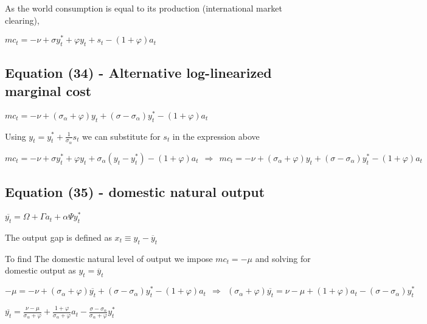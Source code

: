 \documentclass[
]{article}
\begin{document}
As the world consumption is equal to its production (international
market clearing),

\(\displaystyle mc_t =-\nu + \sigma y_t^*+ \varphi y_t+ s_t -(1+\varphi)a_t\)

\vspace{12pt}

\hypertarget{equation-34---alternative-log-linearized-marginal-cost}{%
\subsection{Equation (34) - Alternative log-linearized marginal
cost}\label{equation-34---alternative-log-linearized-marginal-cost}}

\(mc_t = -\nu + (\sigma_\alpha+\varphi)y_t + (\sigma-\sigma_\alpha)y_t^*-(1+\varphi)a_t\)

\vspace{18pt}

Using \(\displaystyle y_t = y_t^* + \frac{1}{\sigma_\alpha}s_t\) we can
substitute for \(s_t\) in the expression above

\(\displaystyle mc_t =-\nu + \sigma y_t^*+ \varphi y_t+ \sigma_\alpha(y_t-y_t^*) -(1+\varphi)a_t \ \ \Rightarrow \ \ mc_t = -\nu + (\sigma_\alpha+\varphi)y_t + (\sigma-\sigma_\alpha)y_t^*-(1+\varphi)a_t\)

\vspace{12pt}

\hypertarget{equation-35---domestic-natural-output}{%
\subsection{Equation (35) - domestic natural
output}\label{equation-35---domestic-natural-output}}

\(\overline{y_t} =\Omega+\Gamma a_t+ \alpha \Psi y_t^*\)

\vspace{8pt}

The output gap is defined as \(x_t \equiv y_t - \overline{y}_t\)

To find The domestic natural level of output we impose \(mc_t=-\mu\) and
solving for domestic output as \(y_t= \overline{y}_t\)

\(-\mu = -\nu + (\sigma_\alpha+\varphi)\overline{y_t} + (\sigma-\sigma_\alpha)y_t^*-(1+\varphi)a_t \ \ \Rightarrow \ \ (\sigma_\alpha+\varphi)\overline{y_t} = \nu -\mu +(1+\varphi)a_t - (\sigma-\sigma_\alpha)y_t^*\)

\(\displaystyle \overline{y_t} = \frac{\nu -\mu}{\sigma_\alpha+\varphi} + \frac{1+\varphi}{\sigma_\alpha+\varphi}a_t - \frac{\sigma-\sigma_\alpha}{\sigma_\alpha+\varphi}y_t^*\)
\end{document}
